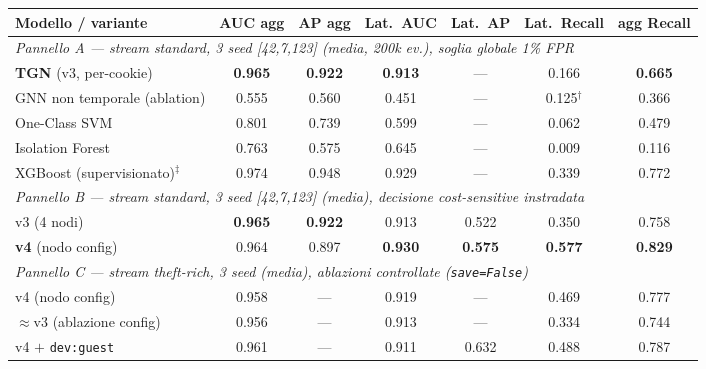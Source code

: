 \documentclass[11pt,a4paper]{report}
\begin{document}
\begin{table}[ht!]
\centering
\footnotesize
\renewcommand{\arraystretch}{1.3}
\setlength{\tabcolsep}{5pt}
\begin{tabular}{l c c c c c c}
\toprule
\textbf{Modello / variante} & \textbf{AUC agg} & \textbf{AP agg} & \textbf{Lat.\ AUC} & \textbf{Lat.\ AP} & \textbf{Lat.\ Recall} & \textbf{agg Recall} \\
\midrule
\multicolumn{7}{l}{\textit{Pannello A — stream standard, 3 seed [42,7,123] (media, 200k ev.), soglia globale 1\% FPR}} \\
\addlinespace[2pt]
\textbf{TGN} (v3, per-cookie)            & \textbf{0.965} & \textbf{0.922} & \textbf{0.913} & ---   & 0.166 & \textbf{0.665} \\
GNN non temporale (ablation)             & 0.555 & 0.560 & 0.451 & ---   & 0.125$^{\dagger}$ & 0.366 \\
One-Class SVM                            & 0.801 & 0.739 & 0.599 & ---   & 0.062 & 0.479 \\
Isolation Forest                         & 0.763 & 0.575 & 0.645 & ---   & 0.009 & 0.116 \\
XGBoost (supervisionato)$^{\ddagger}$    & 0.974 & 0.948 & 0.929 & ---   & 0.339 & 0.772 \\
\midrule
\multicolumn{7}{l}{\textit{Pannello B — stream standard, 3 seed [42,7,123] (media), decisione cost-sensitive instradata}} \\
\addlinespace[2pt]
v3 (4 nodi)                              & \textbf{0.965} & \textbf{0.922} & 0.913 & 0.522 & 0.350 & 0.758 \\
\textbf{v4} (nodo config)                & 0.964 & 0.897 & \textbf{0.930} & \textbf{0.575} & \textbf{0.577} & \textbf{0.829} \\
\midrule
\multicolumn{7}{l}{\textit{Pannello C — stream theft-rich, 3 seed (media), ablazioni controllate (\texttt{save=False})}} \\
\addlinespace[2pt]
v4 (nodo config)                         & 0.958 & ---   & 0.919 & ---   & 0.469 & 0.777 \\
$\approx$v3 (ablazione config)           & 0.956 & ---   & 0.913 & ---   & 0.334 & 0.744 \\
v4 $+$ \texttt{dev:guest}                & 0.961 & ---   & 0.911 & 0.632 & 0.488 & 0.787 \\
\bottomrule
\end{tabular}

\end{table}
\end{document}
